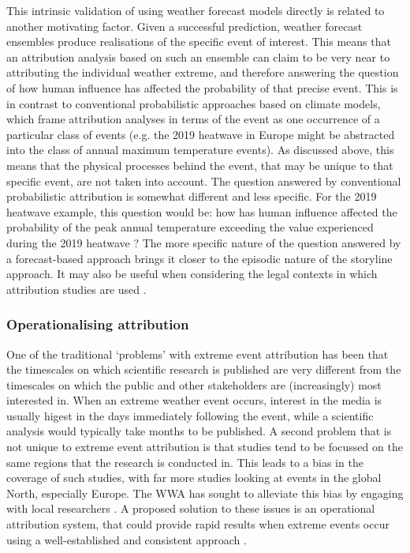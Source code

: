     This intrinsic validation of using weather forecast models directly is related to another motivating factor. Given a successful prediction, weather forecast ensembles produce realisations of the specific event of interest. This means that an attribution analysis based on such an ensemble can claim to be very near to attributing the individual weather extreme, and therefore answering the question of how human influence has affected the probability of that precise event. This is in contrast to conventional probabilistic approaches based on climate models, which frame attribution analyses in terms of the event as one occurrence of a particular class of events (e.g. the 2019 heatwave in Europe might be abstracted into the class of annual maximum temperature events). As discussed above, this means that the physical processes behind the event, that may be unique to that specific event, are not taken into account. The question answered by conventional probabilistic attribution is somewhat different and less specific. For the 2019 heatwave example, this question would be: how has human influence affected the probability of the peak annual temperature exceeding the value experienced during the 2019 heatwave \citep{vautard_human_2020}? The more specific nature of the question answered by a forecast-based approach brings it closer to the episodic nature of the storyline approach. It may also be useful when considering the legal contexts in which attribution studies are used \citep{lloyd_climate_2021-1}.

    \subsubsection{Operationalising attribution}

      One of the traditional `problems' with extreme event attribution has been that the timescales on which scientific research is published are very different from the timescales on which the public and other stakeholders are (increasingly) most interested in. When an extreme weather event occurs, interest in the media is usually higest in the days immediately following the event, while a scientific analysis would typically take months to be published. A second problem that is not unique to extreme event attribution is that studies tend to be focussed on the same regions that the research is conducted in. This leads to a bias in the coverage of such studies, with far more studies looking at events in the global North, especially Europe. The WWA has sought to alleviate this bias by engaging with local researchers \citep{van_oldenborgh_pathways_2021}. A proposed solution to these issues is an operational attribution system, that could provide rapid results when extreme events occur using a well-established and consistent approach \citep{national_academies_of_sciences_engineering_and_medicine_attribution_2016}.

